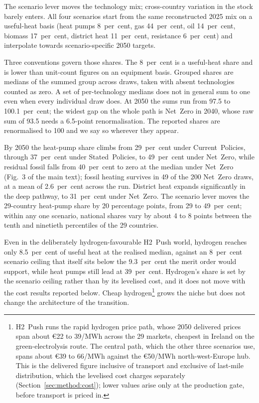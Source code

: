 The scenario lever moves the technology mix; cross-country variation in the stock barely
enters. All four scenarios start from the same reconstructed 2025 mix on a useful-heat
basis (heat pumps 8~per~cent, gas 44~per~cent, oil 14~per~cent, biomass 17~per~cent,
district heat 11~per~cent, resistance 6~per~cent) and interpolate towards
scenario-specific 2050 targets.

Three conventions govern those shares. The 8~per~cent is a useful-heat share and is
lower than unit-count figures on an equipment basis. Grouped shares are medians of the summed
group across draws, taken with absent technologies counted as zero. A set of
per-technology medians does not in general sum to one even when every individual draw
does. At 2050 the sums run from 97.5 to 100.1~per~cent; the widest gap on the whole path is Net~Zero in 2040, whose raw sum of 93.5 needs a 6.5-point renormalisation. The reported shares are renormalised to 100 and we say so wherever they appear.

By 2050 the heat-pump share climbs from 29~per~cent under Current~Policies, through
37~per~cent under Stated~Policies, to 49~per~cent under Net~Zero, while residual fossil
falls from 40~per~cent to zero at the median under Net~Zero (Fig.~3 of the main text);
fossil heating survives in 49 of the 200 Net~Zero draws, at a mean of 2.6~per~cent
across the run. District heat expands significantly in the deep pathway, to 31~per~cent under
Net~Zero. The scenario lever moves the 29-country heat-pump share by 20 percentage
points, from 29 to 49~per~cent; within any one scenario, national shares vary by about 4
to 8 points between the tenth and ninetieth percentiles of the 29 countries.

Even in the deliberately hydrogen-favourable H2~Push world, hydrogen reaches only
8.5~per~cent of useful heat at the realised median, against an 8~per~cent scenario
ceiling that itself sits below the 9.3~per~cent the merit order would support, while
heat pumps still lead at 39~per~cent. Hydrogen's share is set by the scenario ceiling rather than by
its levelised cost, and it does not move with the cost results reported below.
Cheap hydrogen\footnote{H2~Push runs the rapid hydrogen price path, whose 2050 delivered prices span about \euro{}22 to 39/MWh across the 29 markets, cheapest in Ireland on the green-electrolysis route. The central path, which the other three scenarios use, spans about \euro{}39 to 66/MWh against the \euro{}50/MWh north-west-Europe hub. This is the delivered figure inclusive of transport and
exclusive of last-mile distribution, which the levelised cost charges separately
(Section~\ref{sec:method:cost}); lower values arise only at the production gate,
before transport is priced in.} grows
the niche but does not change the architecture of the transition.


